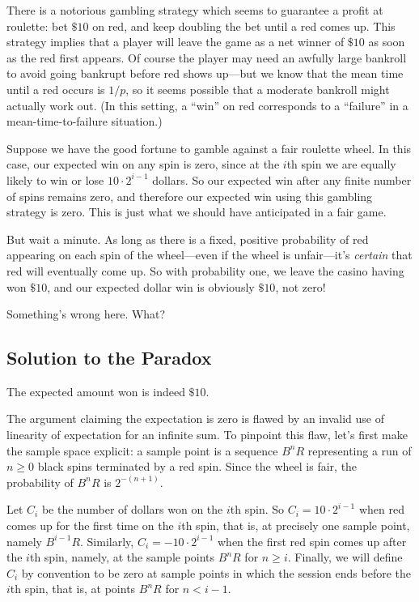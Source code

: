 \documentclass[11pt,twoside]{article}
\begin{document}
There is a notorious gambling strategy which seems to guarantee a profit
at roulette: bet $\$10$ on red, and keep doubling the bet until a red
comes up.  This strategy implies that a player will leave the game as a
net winner of $\$10$ as soon as the red first appears.  Of course the
player may need an awfully large bankroll to avoid going bankrupt before
red shows up---but we know that the mean time until a red occurs is $1/p$,
so it seems possible that a moderate bankroll might actually work out.
(In this setting, a ``win'' on red corresponds to a ``failure'' in a
mean-time-to-failure situation.)

Suppose we have the good fortune to gamble against a fair roulette wheel.
In this case, our expected win on any spin is zero, since at the $i$th
spin we are equally likely to win or lose $10 \cdot 2^{i-1}$ dollars.  So
our expected win after any finite number of spins remains zero, and
therefore our expected win using this gambling strategy is zero.  This is
just what we should have anticipated in a fair game.

But wait a minute.  As long as there is a fixed, positive probability of
red appearing on each spin of the wheel---even if the wheel is
unfair---it's \emph{certain} that red will eventually come up.  So with
probability one, we leave the casino having won $\$10$, and our expected
dollar win is obviously $\$10$, not zero!

Something's wrong here.  What?

\subsection{Solution to the Paradox}

The expected amount won is indeed $\$10$.

The argument claiming the expectation is zero is flawed by an invalid use
of linearity of expectation for an infinite sum.  To pinpoint this flaw,
let's first make the sample space explicit: a sample point is a sequence
$B^nR$ representing a run of $n \geq 0$ black spins terminated by a red
spin.  Since the wheel is fair, the probability of $B^nR$ is $2^{-(n+1)}$.

Let $C_i$ be the number of dollars won on the $i$th spin.  So 
$C_i = 10 \cdot 2^{i-1}$ 
when red comes up for the first time on the $i$th spin, that is, at
precisely one sample point, namely $B^{i-1}R$.  Similarly, 
$C_i = -10  \cdot  2^{i-1}$ 
when the first red spin comes up after the $i$th spin, namely, at the
sample points $B^nR$ for $n \geq i$.  Finally, we will define $C_i$ by
convention to be zero at sample points in which the session ends before the
$i$th spin, that is, at points $B^nR$ for $n < i-1$.
\end{document}
